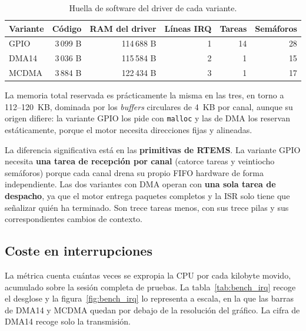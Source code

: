 \begin{table}[H]
    \centering
    \begin{tabular}{lrrrrr}
        \hline
        \textbf{Variante} & \textbf{Código} & \textbf{RAM del driver} & \textbf{Líneas IRQ} & \textbf{Tareas} & \textbf{Semáforos} \\
        \hline
        GPIO  & 3\,099 B & 114\,688 B & 1 & 14 & 28 \\
        DMA14 & 3\,036 B & 115\,584 B & 2 & 1  & 15 \\
        MCDMA & 3\,884 B & 122\,434 B & 3 & 1  & 17 \\
        \hline
    \end{tabular}
    \caption{Huella de software del driver de cada variante.}
    \label{tab:bench_sw}
\end{table}

La memoria total reservada es prácticamente la misma en las tres, en torno a 112--120~KB,
dominada por los \textit{buffers} circulares de 4~KB por canal, aunque su origen difiere: la
variante GPIO los pide con \texttt{malloc} y las de DMA los reservan estáticamente, porque el
motor necesita direcciones fijas y alineadas.

La diferencia significativa está en las \textbf{primitivas de RTEMS}. La variante GPIO necesita
\textbf{una tarea de recepción por canal} (catorce tareas y veintiocho semáforos) porque cada
canal drena su propio FIFO hardware de forma independiente. Las dos variantes con DMA operan con
\textbf{una sola tarea de despacho}, ya que el motor entrega paquetes completos y la ISR solo
tiene que señalizar quién ha terminado. Son trece tareas menos, con sus trece pilas y sus
correspondientes cambios de contexto.

\subsection{Coste en interrupciones}

La métrica cuenta cuántas veces se expropia la CPU por cada kilobyte movido, acumulado sobre la
sesión completa de pruebas. La tabla~\ref{tab:bench_irq} recoge el desglose y la
figura~\ref{fig:bench_irq} lo representa a escala, en la que las barras de DMA14 y MCDMA quedan
por debajo de la resolución del gráfico. La cifra de DMA14 recoge solo la transmisión.

